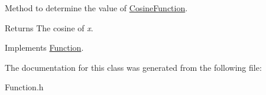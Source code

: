 Method to determine the value of \hyperlink{class_cosine_function}{Cosine\+Function}. 

\begin{DoxyReturn}{Returns}
The cosine of {\itshape x}. 
\end{DoxyReturn}


Implements \hyperlink{class_function_a7773feae8f1def0a2d7e479363700816}{Function}.



The documentation for this class was generated from the following file\+:\begin{DoxyCompactItemize}
\item 
Function.\+h\end{DoxyCompactItemize}
